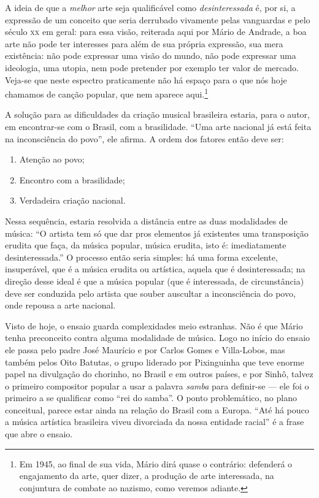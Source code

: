 A ideia de que a \textit{melhor} arte seja qualificável como
\textit{desinteressada} é, por si, a expressão de um conceito que seria
derrubado vivamente pelas vanguardas e pelo século \textsc{xx} em geral: para
essa visão, reiterada aqui por Mário de Andrade, a boa arte não pode ter
interesses para além de sua própria expressão, sua mera existência: não
pode expressar uma visão do mundo, não pode expressar uma ideologia, uma
utopia, nem pode pretender por exemplo ter valor de mercado. Veja-se que
neste espectro praticamente não há espaço para o que nós hoje chamamos
de canção popular, que nem aparece aqui.\footnote{Em 1945, ao final de sua vida, Mário dirá quase o contrário: defenderá
o engajamento da arte, quer dizer, a produção de arte interessada, na
conjuntura de combate ao nazismo, como veremos adiante.}

A solução para as dificuldades da criação musical brasileira estaria,
para o autor, em encontrar-se com o Brasil, com a brasilidade. ``Uma
arte nacional já está feita na inconsciência do povo'', ele afirma. A
ordem dos fatores então deve ser: 

\begin{enumerate}
\item Atenção ao povo;
\item Encontro com a brasilidade;
\item Verdadeira criação nacional.
\end{enumerate}

Nessa sequência, estaria
resolvida a distância entre as duas modalidades de música: ``O artista
tem só que dar pros elementos já existentes uma transposição erudita que
faça, da música popular, música erudita, isto é: imediatamente
desinteressada.'' O processo então seria simples: há uma forma
excelente, insuperável, que é a música erudita ou artística, aquela que
é desinteressada; na direção desse ideal é que a música popular (que é
interessada, de circunstância) deve ser conduzida pelo artista que
souber auscultar a inconsciência do povo, onde repousa a arte nacional.

Visto de hoje, o ensaio guarda complexidades meio estranhas. Não é que
Mário tenha preconceito contra alguma modalidade de música. Logo no
início do ensaio ele passa pelo padre José Maurício e por Carlos Gomes e
Villa-Lobos, mas também pelos Oito Batutas, o grupo liderado por
Pixinguinha que teve enorme papel na divulgação do chorinho, no Brasil e
em outros países, e por Sinhô, talvez o primeiro compositor popular a
usar a palavra \textit{samba} para definir-se --- ele foi o primeiro a se
qualificar como ``rei do samba''. O ponto problemático, no plano
conceitual, parece estar ainda na relação do Brasil com a Europa. ``Até
há pouco a música artística brasileira viveu divorciada da nossa
entidade racial'' é a frase que abre o ensaio.

